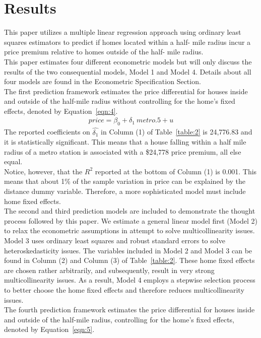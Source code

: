 \documentclass[12pt]{report}
\newcommand\tab[1][.60cm]{\hspace*{#1}}
\begin{document}
\section*{Results}
This paper utilizes a multiple linear regression approach using ordinary least squares estimators to predict if homes located within a half- mile radius incur a price premium relative to homes outside of the half- mile radius.\\
\tab This paper estimates four different econometric models but will only discuss the results of the two consequential models, Model 1 and Model 4. Details about all four models are found in the Econometric Specification Section.\\
\tab The first prediction framework estimates the price differential for houses inside and outside of the half-mile radius without controlling for the home's fixed effects, denoted by Equation~\ref{eqn:4}.
\begin{align}
\ price = \beta_0 +\delta_1\ metro.5 + u \ 
\label{eqn:4}
\end{align}
The reported coefficients on $\hat{\delta_1}$ in Column (1) of Table~\ref{table:2} is 24,776.83 and it is statistically significant. This means that a house falling within a half mile radius of a metro station is associated with a \$24,778 price premium, all else equal.\\
\tab Notice, however, that the $R^2$ reported at the bottom of Column (1) is 0.001. This means that about 1\% of the sample variation in price can be explained by the distance dummy variable. Therefore, a more sophisticated model must include home fixed effects.\\
\tab The second and third prediction models are included to demonstrate the thought process followed by this paper. We estimate a general linear model first (Model 2) to relax the econometric assumptions in attempt to solve multicollinearity issues. Model 3 uses ordinary least squares and robust standard errors to solve heteroskedasticity issues. The variables included in Model 2 and Model 3 can be found in Column (2) and Column (3) of Table~\ref{table:2}. These home fixed effects are chosen rather arbitrarily, and subsequently, result in very strong multicollinearity issues. As a result, Model 4 employs a stepwise selection process to better choose the home fixed effects and therefore reduces multicollinearity issues. \\
\tab The fourth prediction framework estimates the price differential for houses inside and outside of the half-mile radius, controlling for the home's fixed effects, denoted by Equation~\ref{eqn:5}.
\end{document}

